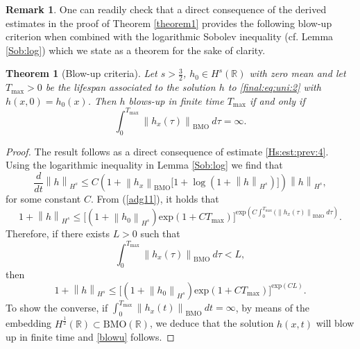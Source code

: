 \documentclass[final,11pt,a4paper,reqno]{amsart}
\newcommand{\norm}[1]{\left\| #1 \right\|}
\newcommand{\RR}{\mathbb R}
\newtheorem{theorem}{Theorem}
\theoremstyle{definition}
\newtheorem{rem}{Remark}
\begin{document}
\begin{rem}
One can readily check that a direct consequence of the derived estimates in the proof of Theorem \ref{theorem1} provides the following blow-up criterion when combined with the logarithmic Sobolev inequality (cf. Lemma \ref{Sob:log}) which we state as a theorem for the sake of clarity.
\begin{theorem}[Blow-up criteria]\label{theorem2}
Let $s>\frac{3}{2}$, 
$h_0\in H^{s}(\RR)$ with zero mean and let $T_{\max}>0$ be the lifespan associated to the solution $h$ to \eqref{final:eq:uni:2} with $h(x,0)=h_0(x)$. Then $h$ blows-up in finite time $T_{\max}$ if and only if
\begin{equation}\label{blowu}
\int_{0}^{T_{\max}}\norm{h_{x}(\tau)}_{\text{BMO}} \  d\tau=\infty.
\end{equation}
\end{theorem}
\begin{proof}
The result follows as a direct consequence of estimate \eqref{Hs:est:prev:4}. Using the logarithmic inequality in Lemma \ref{Sob:log} we find that
\begin{equation}\label{adg11}
\frac{d}{dt}\norm{h}_{H^{s}}\leq C \left(1+\norm{h_{x}}_{\text{BMO}}\big[1+\displaystyle\log(1+\norm{h}_{H^{s}}) \big]  \right)  \norm{h}_{H^{s}},
\end{equation}
for some constant $C$. From (\ref{adg11}), it holds that
\begin{equation*}
1+\norm{h}_{H^{s}}\leq \bigg[(1+ \norm{h_0}_{H^{s}})\mbox{exp}\left(1+CT_{\max} \right)\bigg]^{\mbox{exp}\left(C\int_{0}^{T_{\max}}(\norm{h_{x}(\tau)}_{\text{BMO}}\ d\tau\right)}.
\end{equation*}
Therefore, if there exists $L>0$ such that  $$\displaystyle\int_{0}^{T_{\max}} \norm{h_{x}(\tau)}_{\text{BMO}} \  d\tau <L,$$ then
\begin{equation*}
1+\norm{h}_{H^{s}}\leq \bigg[(1+ \norm{h_0}_{H^{s}})\mbox{exp}\left(1+CT_{\max} \right)\bigg]^{\mbox{exp}\left(CL\right)}.
\end{equation*}
To show the converse, if $\int_{0}^{T_{\max}}\norm{h_{x}(t)}_{\text{BMO}} \  dt=\infty$, by means of the embedding $H^{\frac{1}{2}}(\RR)\subset \text{BMO}(\RR)$, we deduce that the solution $h(x,t)$ will blow up in finite time and \eqref{blowu} follows.
\end{proof}
\end{rem}
\end{document}
